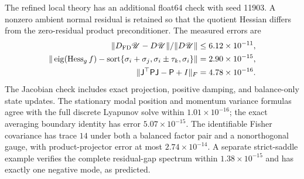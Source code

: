 The refined local theory has an additional float64 check with seed
11903. A nonzero ambient normal residual is retained so that the
quotient Hessian differs from the zero-residual product preconditioner.
The measured errors are
\begin{align}
\|D_{\rm FD}\mathscr U-D\mathscr U\|/
\|D\mathscr U\|&\leq6.12\times10^{-11},\\
\|\operatorname{eig}(\operatorname{Hess}_g f)
-\operatorname{sort}\{\sigma_i+\sigma_j,\sigma_i\pm\tau_k,\sigma_i\}\|
&=2.90\times10^{-15},\\
\|\mathsf J^\top\mathsf P\mathsf J-\mathsf P+I\|_F
&=4.78\times10^{-16}.
\end{align}
The Jacobian check includes exact projection, positive damping, and
balance-only state updates. The stationary modal position and momentum
variance formulas agree with the full discrete Lyapunov solve within
$1.01\times10^{-16}$; the exact averaging boundary identity has error
$5.07\times10^{-15}$. The identifiable Fisher covariance has trace
$14$ under both a balanced factor pair and a nonorthogonal gauge, with
product-projector error at most $2.74\times10^{-14}$.
A separate strict-saddle example verifies the complete residual-gap
spectrum within $1.38\times10^{-15}$ and has exactly one negative mode,
as predicted.
